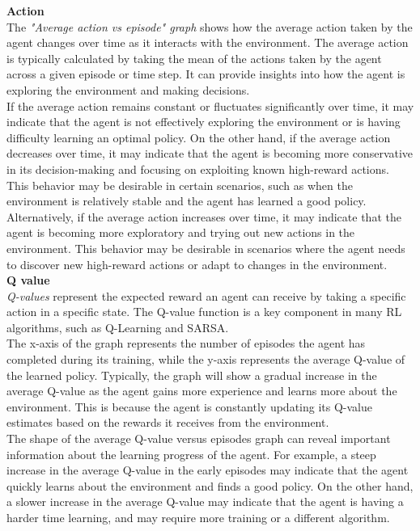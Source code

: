\documentclass[conference]{IEEEtran}
\begin{document}
\textbf{Action}\\

The \textit{"Average action vs episode" graph} shows how the average action taken by the agent changes over time as it interacts with the environment. The average action is typically calculated by taking the mean of the actions taken by the agent across a given episode or time step. It can provide insights into how the agent is exploring the environment and making decisions.\\

If the average action remains constant or fluctuates significantly over time, it may indicate that the agent is not effectively exploring the environment or is having difficulty learning an optimal policy.
On the other hand, if the average action decreases over time, it may indicate that the agent is becoming more conservative in its decision-making and focusing on exploiting known high-reward actions. This behavior may be desirable in certain scenarios, such as when the environment is relatively stable and the agent has learned a good policy.\\

Alternatively, if the average action increases over time, it may indicate that the agent is becoming more exploratory and trying out new actions in the environment. This behavior may be desirable in scenarios where the agent needs to discover new high-reward actions or adapt to changes in the environment.\\

\textbf{Q value}\\

\textit{Q-values} represent the expected reward an agent can receive by taking a specific action in a specific state. The Q-value function is a key component in many RL algorithms, such as Q-Learning and SARSA.\\

The x-axis of the graph represents the number of episodes the agent has completed during its training, while the y-axis represents the average Q-value of the learned policy. Typically, the graph will show a gradual increase in the average Q-value as the agent gains more experience and learns more about the environment. This is because the agent is constantly updating its Q-value estimates based on the rewards it receives from the environment.\\

The shape of the average Q-value versus episodes graph can reveal important information about the learning progress of the agent. For example, a steep increase in the average Q-value in the early episodes may indicate that the agent quickly learns about the environment and finds a good policy. On the other hand, a slower increase in the average Q-value may indicate that the agent is having a harder time learning, and may require more training or a different algorithm.\\
\end{document}

